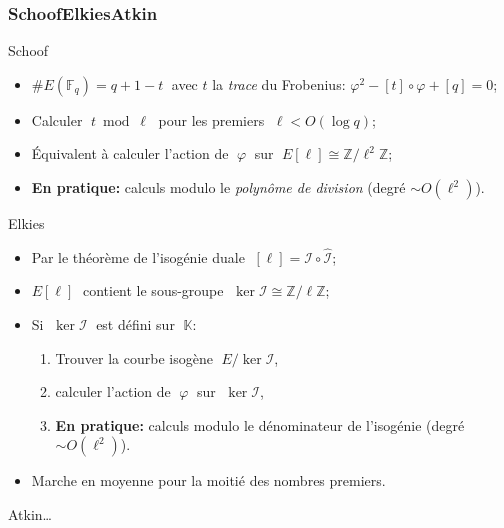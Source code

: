 \documentclass[10pt]{beamer}
\newcommand{\card}[1]{\# #1}  %
\newcommand{\Z}{\mathbb{Z}}  %
\newcommand{\K}{\mathbb{K}}  %
\newcommand{\F}{\mathbb{F}}  %
\newcommand{\isom}{\cong}  %
\newcommand{\frob}{\varphi}  %
\newcommand{\0}{\mathcal{O}}  %
\newcommand{\isog}[1]{\mathcal{#1}}  %
\newcommand{\I}{\isog{I}}  %
\begin{document}

\begin{frame}
  \frametitle{S{\scriptsize choof}E{\scriptsize lkies}A{\scriptsize tkin}}

  \begin{block}{Schoof}
    \begin{itemize}
    \item $\card{E(\F_q)} = q + 1 - t\;$ avec $t$ la \emph{trace} du Frobenius:
      $\frob^2 - [t]\circ\frob + [q] = 0$;
    \item Calculer $\;t\bmod\ell\;$ pour les premiers $\;\ell<O(\log q)$;
    \item Équivalent à calculer l'action de $\;\frob\;$ sur $\;E[\ell]\isom\Z/\ell^2\Z$;
    \item \textbf{En pratique:} calculs modulo le \emph{polynôme de
        division} (\alert{degré $\sim O(\ell^2)$}).
    \end{itemize}
  \end{block}

  \begin{block}{Elkies}
    \begin{itemize}
    \item Par le théorème de l'isogénie duale $\;[\ell] = \I\circ\hat{\I}$;
    \item $E[\ell]\;$ contient le sous-groupe $\;\ker\I\isom\Z/\ell\Z$;
    \item Si $\;\ker\I\;$ est défini sur $\;\K$:
      \begin{enumerate}
      \item Trouver la \alert<2>{courbe isogène} $\;E/\ker\I$,
      \item calculer l'action de  $\;\frob\;$ sur $\;\ker\I$,
      \item \textbf{En pratique:} calculs modulo le
        \alert<2>{dénominateur} de l'isogénie (\alert{degré $\sim
          O(\ell^2)$}).
      \end{enumerate}
    \item Marche en moyenne pour la moitié des nombres premiers.
    \end{itemize}
  \end{block}
  
  Atkin\dots
\end{frame}

\end{document}
